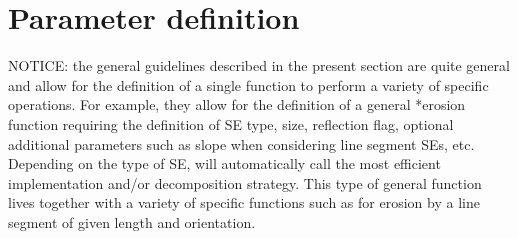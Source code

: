 \documentclass{book}
\renewcommand{\SE}{{SE}}
\begin{document}
\section{Parameter definition}\label{s.pd}

NOTICE: the general guidelines described in the present section are quite general and allow for the definition of a single function to perform a variety of specific operations.  For example, they allow for the definition of a general *erosion function requiring the definition of {\SE} type, size, reflection flag, optional additional parameters such as slope when considering line segment {\SE}s, etc.  Depending on the type of {\SE},  will automatically call the most efficient implementation and/or decomposition strategy.  This type of general function lives together with a variety of specific functions such as  for erosion by a line segment of given length and orientation.

~\\
\end{document}
